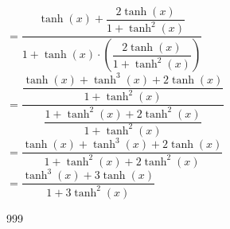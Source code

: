 \documentclass[a4paper]{article}
\begin{document}
$= \dfrac{\tanh(x) + \dfrac{2\tanh(x)}{1 + \tanh^2(x)}}{1+ \tanh(x)\cdot \left(\dfrac{2\tanh(x)}{1+\tanh^2(x)} \right)}$\\

$= \dfrac{\dfrac{\tanh(x)+\tanh^3(x)+2\tanh(x)}{1+\tanh^2(x)}}{\dfrac{1+\tanh^2(x)+2\tanh^2(x)}{1+\tanh^2(x)}}$\\

$= \dfrac{\tanh(x)+\tanh^3(x)+2\tanh(x)}{1+\tanh^2(x)+2\tanh^2(x)}$\\

$= \dfrac{\tanh^3(x)+3\tanh(x)}{1+3\tanh^2(x)}$





\begin{thebibliography}{999}
\end{thebibliography}
\end{document}
